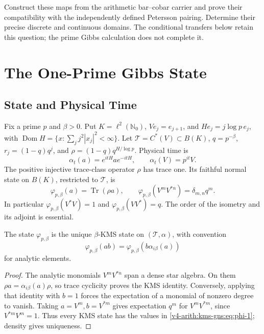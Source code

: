 \begin{question}
\label{v4-arith:kms-gns:question:arithmetic-pairing}
Construct these maps from the arithmetic bar--cobar carrier and
prove their compatibility with the independently defined Petersson
pairing. Determine their precise discrete and continuous domains.
The conditional transfers below retain this question; the prime
Gibbs calculation does not complete it.
\end{question}

\section{The One-Prime Gibbs State}
\label{v4-arith:kms-gns:cycle1}
\subsection{State and Physical Time}
\label{v4-arith:kms-gns:cycle1:state}

Fix a prime \(p\) and \(\beta>0\). Put
\(K=\ell^2(\mathbb N_0)\), \(Ve_j=e_{j+1}\), and
\(He_j=j\log p\,e_j\), with
\(\operatorname{Dom}H=\{x:\sum_jj^2|x_j|^2<\infty\}\).
Let \(\mathcal T=C^*(V)\subset B(K)\),
\(q=p^{-\beta}\), \(r_j=(1-q)q^j\), and
\(\rho=(1-q)q^{H/\log p}\). Physical time is
\begin{equation}
\label{v4-arith:kms-gns:eq:sigma-time}
\alpha_t(a)=e^{itH}ae^{-itH},\qquad \alpha_t(V)=p^{it}V.
\end{equation}
The positive injective trace-class operator \(\rho\) has trace one.
Its faithful normal state on \(B(K)\), restricted to \(\mathcal T\), is
\begin{equation}
\label{v4-arith:kms-gns:eq:phi-1}
\varphi_{p,\beta}(a)=\operatorname{Tr}(\rho a),\qquad
\varphi_{p,\beta}(V^mV^{*n})=\delta_{m,n}q^m.
\end{equation}
In particular \(\varphi_{p,\beta}(V^*V)=1\) and
\(\varphi_{p,\beta}(VV^*)=q\). The order of the isometry and its
adjoint is essential.

\begin{lemma}
\label{v4-arith:kms-gns:lem:KMS-property}
The state \(\varphi_{p,\beta}\) is the unique \(\beta\)-KMS state
on \((\mathcal T,\alpha)\), with convention
\begin{equation}
\label{v4-arith:kms-gns:eq:KMS}
\varphi_{p,\beta}(ab)=\varphi_{p,\beta}(b\alpha_{i\beta}(a))
\end{equation}
for analytic elements.
\end{lemma}
\begin{proof}
The analytic monomials \(V^mV^{*n}\) span a dense star algebra.
On them \(\rho a=\alpha_{i\beta}(a)\rho\), so trace cyclicity
proves the KMS identity. Conversely, applying that identity with
\(b=1\) forces the expectation of a monomial of nonzero degree
to vanish. Taking \(a=V^m,b=V^{*m}\) gives expectation \(q^m\)
for \(V^mV^{*m}\), since \(V^{*m}V^m=1\). Thus every KMS state
has the values in \eqref{v4-arith:kms-gns:eq:phi-1}; density gives
uniqueness.
\end{proof}

